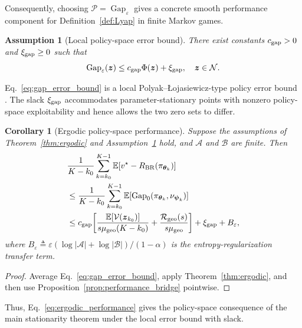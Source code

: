 \documentclass[journal]{IEEEtran}
\newtheorem{corollary}{Corollary}
\newtheorem{assumption}{Assumption}
\theoremstyle{remark}
\newcommand{\E}{\mathbb{E}}
\newcommand{\cN}{\mathcal{N}}
\newcommand{\bz}{\boldsymbol{z}}
\newcommand{\btheta}{\boldsymbol{\theta}}
\newcommand{\bpsi}{\boldsymbol{\psi}}
\newcommand{\Vk}{\mathcal{V}}
\newcommand{\cP}{\mathcal{P}}
\begin{document}
	Consequently, choosing $\cP=\operatorname{Gap}_\varepsilon$ gives a concrete smooth performance component for Definition~\ref{def:Lyap} in finite Markov games.
	
	\begin{assumption}[Local policy-space error bound]\label{ass:performance_error_bound}
		There exist constants $c_{\rm gap}>0$ and $\xi_{\rm gap}\ge0$ such that
		\begin{equation}\label{eq:gap_error_bound}
			\operatorname{Gap}_\varepsilon(\bz)
			\le
			c_{\rm gap}\Phi(\bz)+\xi_{\rm gap},
			\quad
			\bz\in\cN.
		\end{equation}
	\end{assumption}
	
	Eq.~\eqref{eq:gap_error_bound} is a local Polyak--\L{}ojasiewicz-type policy error bound \cite{Karimi2016PL}.
	The slack $\xi_{\rm gap}$ accommodates parameter-stationary points with nonzero policy-space exploitability and hence allows the two zero sets to differ.
	
	\begin{corollary}[Ergodic policy-space performance]\label{cor:ergodic_performance}
		Suppose the assumptions of Theorem~\ref{thm:ergodic} and Assumption~\ref{ass:performance_error_bound} hold, and $\mathcal A$ and $\mathcal B$ are finite.
		Then
		\begin{equation}\label{eq:ergodic_performance}
			\begin{aligned}
				&\frac{1}{K-k_0}\sum_{k=k_0}^{K-1}
				\E[v^\star-R_{\rm BR}(\pi_{\btheta_k})]\\
				&\le
				\frac{1}{K-k_0}\sum_{k=k_0}^{K-1}
				\E[\operatorname{Gap}_0(\pi_{\btheta_k},\nu_{\bpsi_k})]\\
				&\le
				c_{\rm gap}\!\left[
				\frac{\E[\Vk(\bz_{k_0})]}{s\mu_{\rm geo}(K-k_0)}
				+\frac{\mathcal R_{\rm geo}(s)}{s\mu_{\rm geo}}
				\right]
				+\xi_{\rm gap}+B_\varepsilon,
			\end{aligned}
		\end{equation}
		where $B_\varepsilon\triangleq\varepsilon(\log|\mathcal A|+\log|\mathcal B|)/(1-\alpha)$ is the entropy-regularization transfer term.
	\end{corollary}
	\begin{proof}
		Average Eq.~\eqref{eq:gap_error_bound}, apply Theorem~\ref{thm:ergodic}, and then use Proposition~\ref{prop:performance_bridge} pointwise.
	\end{proof}
	
	Thus, Eq.~\eqref{eq:ergodic_performance} gives the policy-space consequence of the main stationarity theorem under the local error bound with slack.
	
\end{document}
